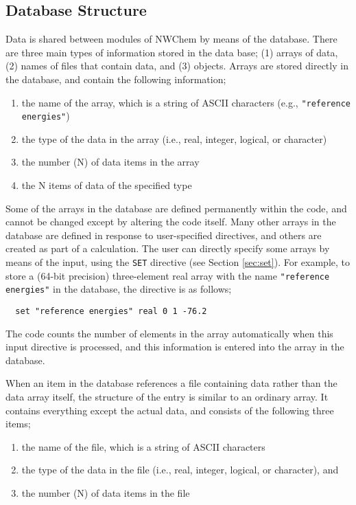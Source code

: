 \subsection{Database Structure}
\label{database}

Data is shared between modules of NWChem by means of the database.  There
are three main types of information stored in the data base; (1) arrays of
data, (2) names of files that contain data, and (3) objects.  
Arrays are stored directly in the database, and contain the following
information;

\begin{enumerate}
\item the name of the array, which is a string of ASCII characters (e.g., 
      \verb+"reference energies"+)
\item the type of the data in the array 
(i.e., real, integer, logical, or character) 
\item the number (N) of data items in the array
\item the N items of data of the specified type
\end{enumerate}

Some of the arrays in the database are defined permanently within the code, and
cannot be changed except by altering the code itself.  Many other arrays in the
database are defined in response to user-specified directives, and
others are created as part
of a calculation.  The user can directly specify some arrays by means of
the input, using the \verb+SET+ directive (see Section \ref{sec:set}).  
For example, to store a (64-bit precision) three-element real array 
with the name \verb+"reference energies"+ in the database, the directive is 
as follows;

\begin{verbatim}
  set "reference energies" real 0 1 -76.2
\end{verbatim}

The code counts the number of elements in the array automatically when this input
directive is processed, and this information is entered 
into the array in the database.

When an item in the database references a file containing data rather
than the data array itself, the structure of the entry is 
similar to an ordinary array.  It contains everything except 
the actual data, and consists of the following
three items;

\begin{enumerate}
\item the name of the file, which is a string of ASCII characters
\item the type of the data in the file (i.e., real, integer, logical, 
or character), and 
\item the number (N) of data items in the file
\end{enumerate}

